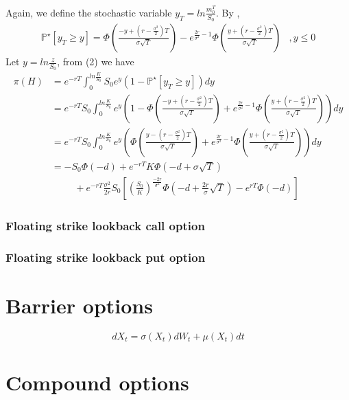 \documentclass{article}
\begin{document}
Again, we define the stochastic variable $y_T= ln \frac{m_{0}^{T}}{S_0}$. By \cite{Peter1},
\begin{align*}
\mathbb{P}^{\star}[y_T \geq y]= \Phi \left(\frac{-y+(r-\frac{\sigma^2}{2})T}{\sigma\sqrt{T}} \right) - e^{\frac{2r}{\sigma^2} - 1} \Phi \left(\frac{y+(r-\frac{\sigma^2}{2})T}{\sigma\sqrt{T}} \right)
&, y \leq 0
\end{align*}
Let $y=ln\frac{z}{S_0}$, from (2) we have
\begin{align*}
\pi(H) 	&= e^{-rT} \int_{0}^{ln\frac{K}{S_0}} S_0e^y( 1 - \mathbb{P}^{\star}[y_T \geq y])dy \\
			&= e^{-rT}S_0 \int_{0}^{ln\frac{K}{S_0}}  e^y \left( 1 -  
			\Phi \left(\frac{-y+(r-\frac{\sigma^2}{2})T}{\sigma\sqrt{T}} \right) + e^{\frac{2r}{\sigma^2} - 1} \Phi \left(\frac{y+(r-\frac{\sigma^2}{2})T}{\sigma\sqrt{T}} \right)
			\right) dy \\
			&= e^{-rT}S_0 \int_{0}^{ln\frac{K}{S_0}} e^y \left( 
			\Phi \left(\frac{y-(r-\frac{\sigma^2}{2})T}{\sigma\sqrt{T}} \right) + e^{\frac{2r}{\sigma^2} - 1} \Phi \left(\frac{y+(r-\frac{\sigma^2}{2})T}{\sigma\sqrt{T}} \right)
			\right) dy \\
			&= -S_0 \Phi(-d) + e^{-rT}K \Phi(-d + \sigma \sqrt{T} ) \\
			&\hspace{1cm} + e^{-rT}\frac{\sigma^2}{2r}S_0 \left[
			\left(\frac{S_0}{K}\right)^{\frac{-2r}{\sigma^2}} \Phi\left(-d+ \frac{2r}{\sigma}\sqrt{T} \right) - e^{rT}\Phi(-d)
			\right]
\end{align*}

\subsubsection{Floating strike lookback call option
}
\subsubsection{Floating strike lookback put option
}
\section{Barrier options
}


\[
dX_t=\sigma(X_t)dW_t + \mu(X_t) dt
\]


\section{Compound options
}
\end{document}
